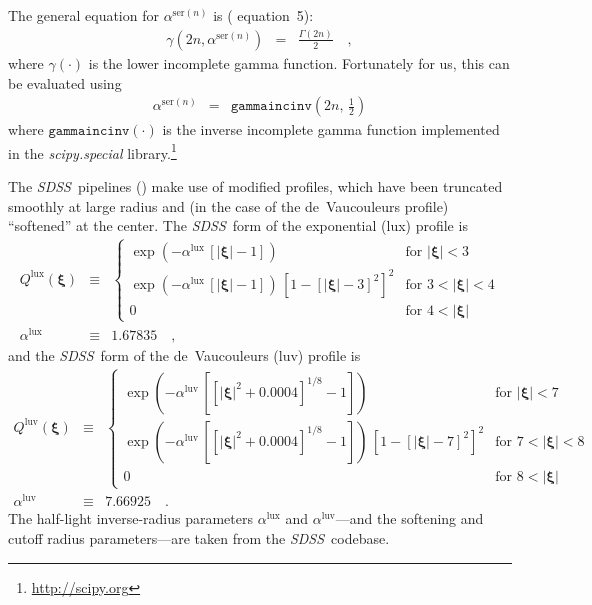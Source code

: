 \documentclass[12pt,pdftex,preprint]{aastex}
\newcommand{\project}[1]{\textsl{#1}}
\newcommand{\sdss}{\project{SDSS}}
\newcommand{\tvector}[1]{\boldsymbol{#1}}
\newcommand{\spos}{\tvector{\xi}}
\newcommand{\ser}{\mathrm{ser}}
\newcommand{\lux}{\mathrm{lux}}
\newcommand{\luv}{\mathrm{luv}}
\begin{document}
The general equation for $\alpha^{\ser(n)}$ is (\citealt{ciotti} equation~5):
\begin{eqnarray}
\gamma(2 n, \alpha^{\ser(n)}) &=& \frac{\Gamma(2 n)}{2}
\quad ,
\end{eqnarray}
where $\gamma(\cdot)$ is the lower incomplete gamma function.
Fortunately for us, this can be evaluated using
\begin{eqnarray}
\alpha^{\ser(n)} &=& \texttt{gammaincinv}(2 n, \, \frac{1}{2})
\end{eqnarray}
where $\texttt{gammaincinv}(\cdot)$ is the inverse incomplete gamma function implemented
in the \project{scipy.special} library.\footnote{\url{http://scipy.org}}

The \sdss\ pipelines (\citealt{lupton}) make use of modified profiles,
which have been truncated smoothly at large radius and (in the case of
the de~Vaucouleurs profile) ``softened'' at the center.  The
\sdss\ form of the exponential (lux) profile is
\begin{eqnarray}\displaystyle
Q^{\lux}(\spos) &\equiv& \left\{\begin{array}{ll}
  \exp(-\alpha^{\lux}\,[|\spos| - 1]) & \mbox{for~}|\spos| < 3 \\
  \exp(-\alpha^{\lux}\,[|\spos| - 1])
  \,\left[1 - [|\spos| - 3]^2\right]^2 & \mbox{for~}3 < |\spos| < 4 \\
  0                                   & \mbox{for~}4 < |\spos|
\end{array}\right.
\\
\alpha^{\lux} &\equiv& 1.67835
\quad ,
\end{eqnarray}
and the \sdss\ form of the de~Vaucouleurs (luv) profile is
\begin{eqnarray}\displaystyle
Q^{\luv}(\spos) &\equiv& \left\{\begin{array}{ll}
  \exp(-\alpha^{\luv}\,\left[[|\spos|^2 + 0.0004]^{1/8} - 1\right]) & \mbox{for~}|\spos| < 7 \\
  \exp(-\alpha^{\luv}\,\left[[|\spos|^2 + 0.0004]^{1/8} - 1\right])
  \,\left[1 - [|\spos| - 7]^2\right]^2 & \mbox{for~}7 < |\spos| < 8 \\
  0                                   & \mbox{for~}8 < |\spos|
\end{array}\right.
\\
\alpha^{\luv} &\equiv& 7.66925
\quad .
\end{eqnarray}
The half-light inverse-radius parameters $\alpha^{\lux}$ and
$\alpha^{\luv}$---and the softening and cutoff radius parameters---are
taken from the \sdss\ codebase.
\end{document}
